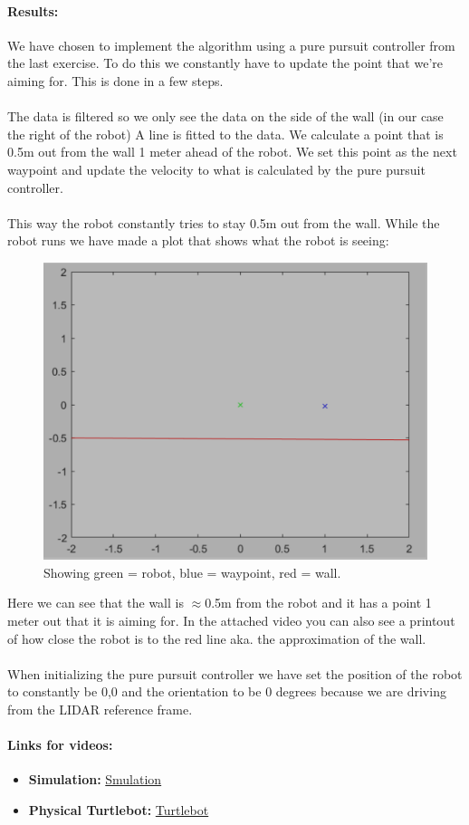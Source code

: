 \documentclass[12pt,a4paper]{article}
\begin{document}
	\paragraph{Results:}
	We have chosen to implement the algorithm using a pure pursuit controller from the last exercise. To do this we constantly have to update the point that we’re aiming for. This is done in a few steps.
	\\\\
	The data is filtered so we only see the data on the side of the wall (in our case the right of the robot)
	A line is fitted to the data.
	We calculate a point that is 0.5m out from the wall 1 meter ahead of the robot.
	We set this point as the next waypoint and update the velocity to what is calculated by the pure pursuit controller.
	\\\\
	This way the robot constantly tries to stay 0.5m out from the wall. While the robot runs we have made a plot that shows what the robot is seeing:
	\begin{figure}[!h]
		\centering
		\includegraphics[width=\textwidth]{fig7}
		\caption{Showing green = robot, blue = waypoint, red = wall.}
		\label{fig:fig7}
	\end{figure}
	
	Here we can see that the wall is $\approx$0.5m from the robot and it has a point 1 meter out that it is aiming for. In the attached video you can also see a printout of how close the robot is to the red line aka. the approximation of the wall.
	\\\\
	When initializing the pure pursuit controller we have set the position of the robot to constantly be 0,0 and the orientation to be 0 degrees because we are driving from the LIDAR reference frame. 
	
	\paragraph{Links for videos:}
	\begin{itemize}
		\item \textbf{Simulation:} \href{https://www.youtube.com/watch?v=JomIcrJGUDA}{Smulation}
		\item \textbf{Physical Turtlebot:} \href{https://youtu.be/y9jW8Li3KjQ}{Turtlebot}
	\end{itemize}
\end{document}
